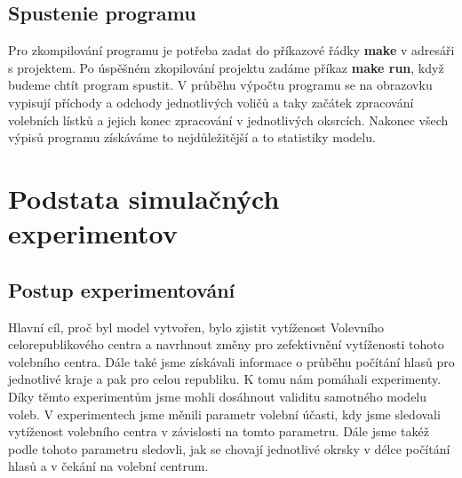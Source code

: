\documentclass[12pt,a4paper,titlepage,final]{article}
\begin{document}
\subsection{Spustenie programu}
Pro zkompilování programu je potřeba zadat do příkazové řádky \textbf{make} v adresáři s projektem. Po úspěšném zkopilování projektu zadáme příkaz \textbf{make run}, když budeme chtít program spustit. V průběhu výpočtu programu se na obrazovku vypisují příchody a odchody jednotlivých voličů a taky začátek zpracování volebních lístků a jejich konec zpracování v jednotlivých oksrcích. Nakonec všech výpisů programu získáváme to nejdůležitější a to statistiky modelu.
\newpage


\section{Podstata simulačných experimentov}
\subsection{Postup experimentování}
Hlavní cíl, proč byl model vytvořen, bylo zjistit vytíženost Volevního celorepublikového centra a navrhnout změny pro zefektivnění vytíženosti tohoto volebního centra. Dále také jsme získávali informace o průběhu počítání hlasů pro jednotlivé kraje a pak pro celou republiku. K tomu nám pomáhali experimenty. Díky těmto experimentům jsme mohli dosáhnout validitu samotného modelu voleb. V experimentech jsme měnili parametr volební účasti, kdy jsme sledovali vytíženost volebního centra v závislosti na tomto parametru. Dále jsme takéž podle tohoto parametru sledovli, jak se chovají jednotlivé okrsky v délce počítání hlasů a v čekání na volební centrum. 
  
\end{document}
